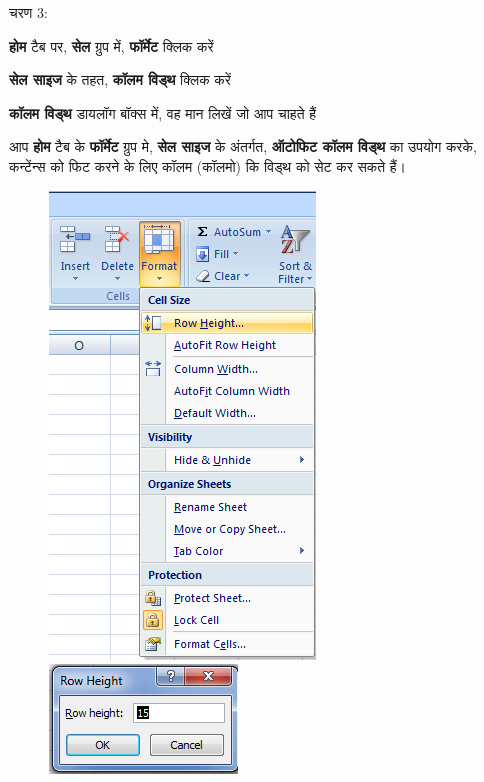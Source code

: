 \begin{descriptionSimple}{चरण 3:}
\item[चरण 1] \textbf{होम} टैब पर, \textbf{सेल} ग्रुप में, \textbf{फॉर्मेट} क्लिक करें
\item[चरण 2] \textbf{सेल साइज} के तहत, \textbf{कॉलम विड्थ } क्लिक करें
\item[चरण 3] \textbf{कॉलम विड्थ } डायलॉग बॉक्स में, वह मान लिखें जो आप चाहते हैं
\end{descriptionSimple}
आप \textbf{होम} टैब के \textbf{फॉर्मेट} ग्रुप मे, \textbf{सेल साइज} के अंतर्गत, \textbf{ऑटोफिट कॉलम विड्थ } का उपयोग करके, कन्टेंन्स को फिट करने के लिए कॉलम (कॉलमो) कि विड्थ को सेट कर सकते हैं।
\begin{figure}[H]
\centering
\includegraphics[scale=.75]{src/images/chapter2/chapter2_fig10.png}\qquad
\includegraphics[scale=.75]{src/images/chapter2/chapter2_fig11.png}
\end{figure}

\newpage

